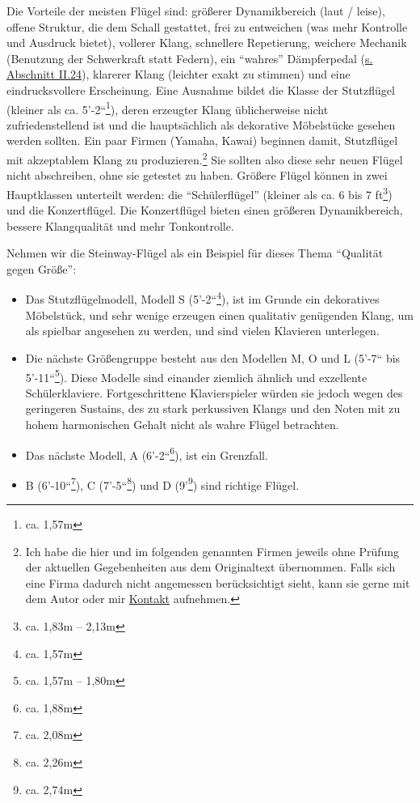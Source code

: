 Die Vorteile der meisten Flügel sind: größerer Dynamikbereich (laut / leise), offene Struktur, die dem Schall gestattet, frei zu entweichen (was mehr Kontrolle und Ausdruck bietet), vollerer Klang, schnellere Repetierung, weichere Mechanik (Benutzung der Schwerkraft statt Federn), ein \enquote{wahres} Dämpferpedal (\hyperref[c1ii24]{s. Abschnitt II.24}), klarerer Klang (leichter exakt zu stimmen) und eine eindrucksvollere Erscheinung.
Eine Ausnahme bildet die Klasse der Stutzflügel (kleiner als ca. 5'-2``\footnote{ca. 1,57m}), deren erzeugter Klang üblicherweise nicht zufriedenstellend ist und die hauptsächlich als dekorative Möbelstücke gesehen werden sollten.
Ein paar Firmen (Yamaha, Kawai) beginnen damit, Stutzflügel mit akzeptablem Klang zu produzieren.\footnote{Ich habe die hier und im folgenden genannten Firmen jeweils ohne Prüfung der aktuellen Gegebenheiten aus dem Originaltext übernommen.
Falls sich eine Firma dadurch nicht angemessen berücksichtigt sieht, kann sie gerne mit dem Autor oder mir \hyperref[kontakt]{Kontakt} aufnehmen.}
Sie sollten also diese sehr neuen Flügel nicht abschreiben, ohne sie getestet zu haben.
Größere Flügel können in zwei Hauptklassen unterteilt werden: die \enquote{Schülerflügel}  (kleiner als ca. 6 bis 7 ft\footnote{ca. 1,83m -- 2,13m}) und die Konzertflügel.
Die Konzertflügel bieten einen größeren Dynamikbereich, bessere Klangqualität und mehr Tonkontrolle.

Nehmen wir die Steinway-Flügel als ein Beispiel für dieses Thema \enquote{Qualität gegen Größe}:

\begin{itemize} 
\item Das Stutzflügelmodell, Modell S (5'-2``\footnote{ca. 1,57m}), ist im Grunde ein dekoratives Möbelstück, und sehr wenige erzeugen einen qualitativ genügenden Klang, um als spielbar angesehen zu werden, und sind vielen Klavieren unterlegen.
\item Die nächste Größengruppe besteht aus den Modellen M, O und L (5'-7`` bis 5'-11``\footnote{ca. 1,57m -- 1,80m}).
Diese Modelle sind einander ziemlich ähnlich und exzellente Schülerklaviere.
Fortgeschrittene Klavierspieler würden sie jedoch wegen des geringeren Sustains, des zu stark perkussiven Klangs und den Noten mit zu hohem harmonischen Gehalt nicht als wahre Flügel betrachten.
\item Das nächste Modell, A (6'-2``\footnote{ca. 1,88m}), ist ein Grenzfall.
\item B (6'-10``\footnote{ca. 2,08m}), C (7'-5``\footnote{ca. 2,26m}) und D (9'\footnote{ca. 2,74m}) sind richtige Flügel.
\end{itemize}

